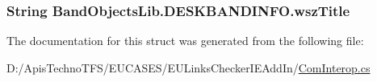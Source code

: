 \hypertarget{struct_band_objects_lib_1_1_d_e_s_k_b_a_n_d_i_n_f_o_a4c321fa662cfea35d6050677259b3fc4}{
\subsubsection[{wsz\+Title}]{\setlength{\rightskip}{0pt plus 5cm}String Band\+Objects\+Lib.\+D\+E\+S\+K\+B\+A\+N\+D\+I\+N\+F\+O.\+wsz\+Title}}\label{struct_band_objects_lib_1_1_d_e_s_k_b_a_n_d_i_n_f_o_a4c321fa662cfea35d6050677259b3fc4}


The documentation for this struct was generated from the following file\+:\begin{DoxyCompactItemize}
\item 
D\+:/\+Apis\+Techno\+T\+F\+S/\+E\+U\+C\+A\+S\+E\+S/\+E\+U\+Links\+Checker\+I\+E\+Add\+In/\hyperlink{_com_interop_8cs}{Com\+Interop.\+cs}\end{DoxyCompactItemize}
